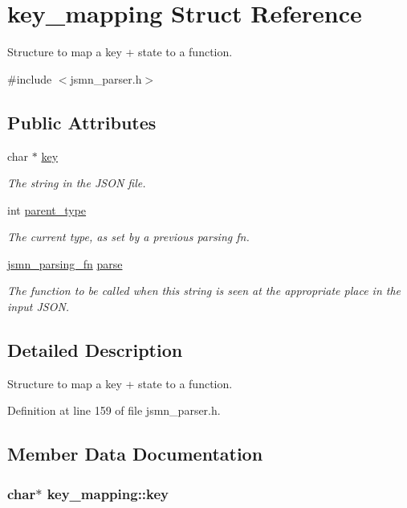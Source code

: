 \hypertarget{structkey__mapping}{\section{key\-\_\-mapping Struct Reference}
\label{structkey__mapping}
}


Structure to map a key + state to a function.  




{\ttfamily \#include $<$jsmn\-\_\-parser.\-h$>$}

\subsection*{Public Attributes}
\begin{DoxyCompactItemize}
\item 
char $\ast$ \hyperlink{structkey__mapping_a900fa61797216c8fbffd042cd12f4e62}{key}
\begin{DoxyCompactList}\small\item\em The string in the J\-S\-O\-N file. \end{DoxyCompactList}\item 
int \hyperlink{structkey__mapping_ae5ee4a8838ac3c188143edb081e78207}{parent\-\_\-type}
\begin{DoxyCompactList}\small\item\em The current type, as set by a previous parsing fn. \end{DoxyCompactList}\item 
\hyperlink{jsmn__parser_8h_a21c1272bc8a1fb518bd46118b824870f}{jsmn\-\_\-parsing\-\_\-fn} \hyperlink{structkey__mapping_a5aaab47c145def7d5d253d8e3309b993}{parse}
\begin{DoxyCompactList}\small\item\em The function to be called when this string is seen at the appropriate place in the input J\-S\-O\-N. \end{DoxyCompactList}\end{DoxyCompactItemize}


\subsection{Detailed Description}
Structure to map a key + state to a function. 

Definition at line 159 of file jsmn\-\_\-parser.\-h.



\subsection{Member Data Documentation}
\hypertarget{structkey__mapping_a900fa61797216c8fbffd042cd12f4e62}{
\subsubsection[{key}]{\setlength{\rightskip}{0pt plus 5cm}char$\ast$ key\-\_\-mapping\-::key}}\label{structkey__mapping_a900fa61797216c8fbffd042cd12f4e62}


